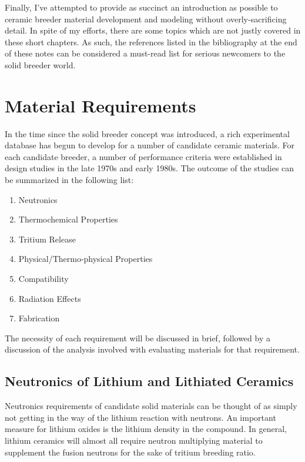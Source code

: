 \documentclass[11pt]{report} %
\begin{document}
Finally, I've attempted to provide as succinct an introduction as possible to ceramic breeder material development and modeling without overly-sacrificing detail. In spite of my efforts, there are some topics which are not justly covered in these short chapters. As such, the references listed in the bibliography at the end of these notes can be considered a must-read list for serious newcomers to the solid breeder world.


\section{Material Requirements}
In the time since the solid breeder concept was introduced, a rich experimental database has begun to develop for a number of candidate ceramic materials. For each candidate breeder, a number of performance criteria were established in design studies in the late 1970s and early 1980s. The outcome of the studies can be summarized in the following list:
\begin{enumerate}
\item Neutronics
\item Thermochemical Properties
\item Tritium Release
\item Physical/Thermo-physical Properties
\item Compatibility
\item Radiation Effects
\item Fabrication
\end{enumerate}

The necessity of each requirement will be discussed in brief, followed by a discussion of the analysis involved with evaluating materials for that requirement.

\subsection{Neutronics of Lithium and Lithiated Ceramics}
Neutronics requirements of candidate solid materials can be thought of as simply not getting in the way of the lithium reaction with neutrons. An important measure for lithium oxides is the lithium density in the compound. In general, lithium ceramics will almost all require neutron multiplying material to supplement the fusion neutrons for the sake of tritium breeding ratio.
\end{document}
